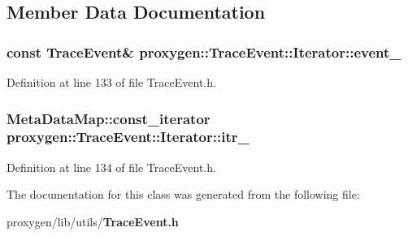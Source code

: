\subsection{Member Data Documentation}
\subsubsection[{event\+\_\+}]{\setlength{\rightskip}{0pt plus 5cm}const {\bf Trace\+Event}\& proxygen\+::\+Trace\+Event\+::\+Iterator\+::event\+\_\+\hspace{0.3cm}{\ttfamily [private]}}\label{classproxygen_1_1TraceEvent_1_1Iterator_a14223263320bec1e867890594862ac3a}


Definition at line 133 of file Trace\+Event.\+h.

\subsubsection[{itr\+\_\+}]{\setlength{\rightskip}{0pt plus 5cm}Meta\+Data\+Map\+::const\+\_\+iterator proxygen\+::\+Trace\+Event\+::\+Iterator\+::itr\+\_\+\hspace{0.3cm}{\ttfamily [private]}}\label{classproxygen_1_1TraceEvent_1_1Iterator_a4b4cf09b07ddf6e302f33e7eb14bf7c6}


Definition at line 134 of file Trace\+Event.\+h.



The documentation for this class was generated from the following file\+:\begin{DoxyCompactItemize}
\item 
proxygen/lib/utils/{\bf Trace\+Event.\+h}\end{DoxyCompactItemize}
